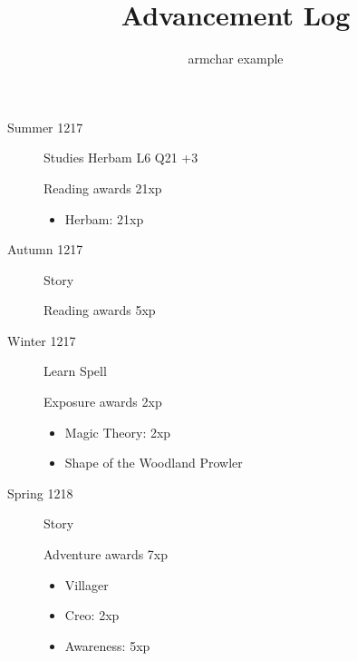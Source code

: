 \documentclass{scrartcl}
\title{Advancement Log}
\author{armchar example}
\begin{document}
\maketitle
\begin{description}
  \item[Summer 1217]
    Studies Herbam L6 Q21 +3

    Reading awards 21xp
    \begin{itemize}
      \item Herbam: 21xp
    \end{itemize}
  \item[Autumn 1217]
    Story

    Reading awards 5xp
    \begin{itemize}
    \end{itemize}
  \item[Winter 1217]
    Learn Spell

    Exposure awards 2xp
    \begin{itemize}
      \item Magic Theory: 2xp
      \item Shape of the Woodland Prowler
    \end{itemize}
  \item[Spring 1218]
    Story

    Adventure awards 7xp
    \begin{itemize}
      \item Villager
      \item Creo: 2xp
      \item Awareness: 5xp
    \end{itemize}
\end{description}
\end{document}
